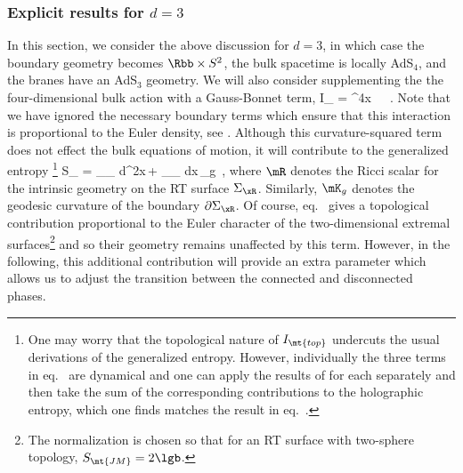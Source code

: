 \subsubsection*{Explicit results for $d=3$}
In this section, we consider the above discussion for $d=3$, in which case the boundary geometry becomes $\Rbb\times S^{2}$, the bulk spacetime is locally AdS$_4$, and the branes have an AdS$_3$ geometry. We will also consider supplementing the the four-dimensional bulk action  with a Gauss-Bonnet term, %
 \beq
I_ =   \int {}^4x \, \, \,.
 \eeq
Note that we have ignored the necessary boundary terms which ensure that this interaction is proportional to the Euler density, \eg see \cite{Myers:1987yn}. Although this curvature-squared term does not effect the bulk equations of motion, it will contribute to the generalized entropy \cite{Dong:2013qoa,Hung:2011xb}\footnote{One may worry that the topological nature of $I_\mt{top}$ undercuts the usual derivations of the generalized entropy. However, individually the three terms in eq.~ are dynamical and one can apply the results of \cite{Dong:2013qoa} for each separately and then take the sum of the corresponding contributions to the holographic entropy, which one finds matches the result in eq.~.}
 \beq
S_ = \frac{\lgb}{4\pi} \int_{\Sigma_\xR} d^2x\,\mR +\frac{\lgb}{2\pi} \int_{\partial \Sigma_\xR}
dx\,\mK_g \,,
 \eeq
where $\mR$ denotes the Ricci scalar for the intrinsic geometry on the RT surface $\Sigma_\xR$. Similarly, $\mK_g$ denotes the geodesic curvature of the boundary $\partial \Sigma_\xR$. Of course, eq.~ gives a topological contribution proportional to the Euler character of the two-dimensional extremal surfaces\footnote{The normalization is chosen so that for an RT surface with two-sphere topology, $S_\mt{JM} = 2 \lgb$.} and so their geometry remains unaffected by this term. However, in the following, this additional contribution will  provide an extra parameter which allows us to adjust the transition between the connected and disconnected phases.

